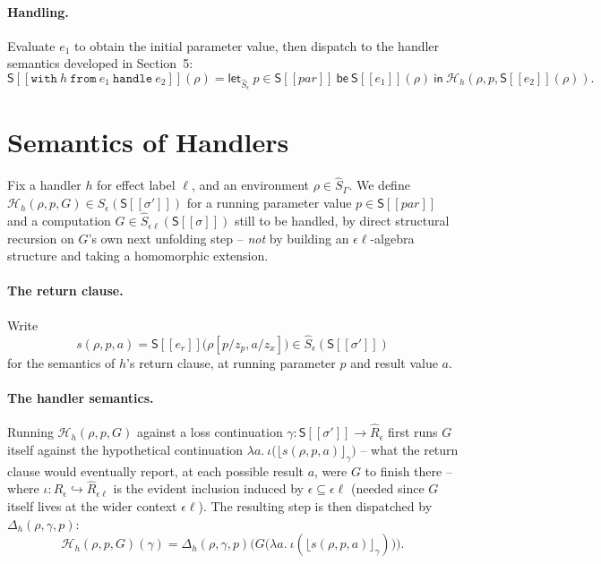 \documentclass[11pt]{article}
\theoremstyle{plain}
\newcommand{\Ssem}[1]{\mathsf{S}[\![#1]\!]}
\newcommand{\Rm}[1]{\widehat{R}_{#1}}
\newcommand{\Sm}[1]{\widehat{S}_{#1}}
\newcommand{\eps}{\epsilon}
\newcommand{\rpt}[2]{\lfloor #1\rfloor_{#2}}
\begin{document}
\paragraph{Handling.} Evaluate $e_1$ to obtain the initial parameter value, then dispatch to
the handler semantics developed in Section~5:
\[
  \Ssem{\mathtt{with}\ h\ \mathtt{from}\ e_1\ \mathtt{handle}\ e_2}(\rho) = \mathsf{let}_{\Sm\eps}\ p\in\Ssem{\mathit{par}}\ \mathsf{be}\ \Ssem{e_1}(\rho)\ \mathsf{in}\ \mathcal H_h(\rho,p,\Ssem{e_2}(\rho)).
\]

\section{Semantics of Handlers}

Fix a handler $h$ for effect label $\ell$, and an environment $\rho\in\Sm\Gamma$. We define
$\mathcal H_h(\rho,p,G) \in \Sm\eps(\Ssem{\sigma'})$ for a running parameter value
$p\in\Ssem{\mathit{par}}$ and a computation $G\in\Sm{\eps\ell}(\Ssem\sigma)$ still to be
handled, by direct structural recursion on $G$'s own next unfolding step -- \emph{not} by
building an $\eps\ell$-algebra structure and taking a homomorphic extension.

\paragraph{The return clause.} Write
\[
  s(\rho,p,a) = \Ssem{e_r}\big(\rho[p/z_p,a/z_x]\big) \in \Sm\eps(\Ssem{\sigma'})
\]
for the semantics of $h$'s return clause, at running parameter $p$ and result value $a$.

\paragraph{The handler semantics.} Running $\mathcal H_h(\rho,p,G)$ against a loss
continuation $\gamma:\Ssem{\sigma'}\to\Rm\eps$ first runs $G$ itself against the
hypothetical continuation $\lambda a.\ \iota\big(\rpt{s(\rho,p,a)}{\gamma}\big)$ -- what the
return clause would eventually report, at each possible result $a$, were $G$ to finish
there -- where $\iota:\Rm\eps\hookrightarrow\Rm{\eps\ell}$ is the evident inclusion induced
by $\eps\subseteq\eps\ell$ (needed since $G$ itself lives at the wider context $\eps\ell$).
The resulting step is then dispatched by $\Delta_h(\rho,\gamma,p)$:
\[
  \mathcal H_h(\rho,p,G)(\gamma) = \Delta_h(\rho,\gamma,p)\Big(G\big(\lambda a.\ \iota(\rpt{s(\rho,p,a)}{\gamma})\big)\Big).
\]
\end{document}
